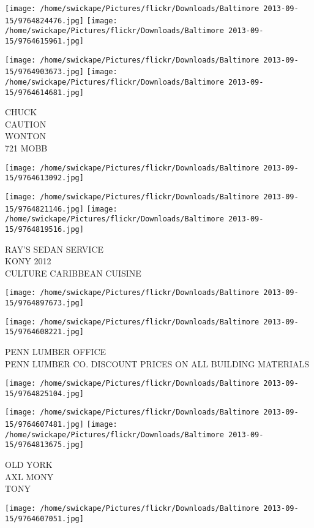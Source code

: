 \documentclass[10pt,letterpaper]{article}
\begin{document}
\texttt{[image: /home/swickape/Pictures/flickr/Downloads/Baltimore 2013-09-15/9764824476.jpg]}
\texttt{[image: /home/swickape/Pictures/flickr/Downloads/Baltimore 2013-09-15/9764615961.jpg]}

\texttt{[image: /home/swickape/Pictures/flickr/Downloads/Baltimore 2013-09-15/9764903673.jpg]}
\texttt{[image: /home/swickape/Pictures/flickr/Downloads/Baltimore 2013-09-15/9764614681.jpg]}

CHUCK\\
CAUTION\\
WONTON\\
721 MOBB
\pagebreak

\texttt{[image: /home/swickape/Pictures/flickr/Downloads/Baltimore 2013-09-15/9764613092.jpg]}

\vspace{0.25in}
\texttt{[image: /home/swickape/Pictures/flickr/Downloads/Baltimore 2013-09-15/9764821146.jpg]}
\texttt{[image: /home/swickape/Pictures/flickr/Downloads/Baltimore 2013-09-15/9764819516.jpg]}

RAY'S SEDAN SERVICE\\
KONY 2012\\
CULTURE CARIBBEAN CUISINE
\pagebreak

\texttt{[image: /home/swickape/Pictures/flickr/Downloads/Baltimore 2013-09-15/9764897673.jpg]}

\vspace{0.25in}
\texttt{[image: /home/swickape/Pictures/flickr/Downloads/Baltimore 2013-09-15/9764608221.jpg]}

PENN LUMBER OFFICE\\
PENN LUMBER CO. DISCOUNT PRICES ON ALL BUILDING MATERIALS
\pagebreak

\texttt{[image: /home/swickape/Pictures/flickr/Downloads/Baltimore 2013-09-15/9764825104.jpg]}

\vspace{0.25in}
\texttt{[image: /home/swickape/Pictures/flickr/Downloads/Baltimore 2013-09-15/9764607481.jpg]}
\texttt{[image: /home/swickape/Pictures/flickr/Downloads/Baltimore 2013-09-15/9764813675.jpg]}

OLD YORK\\
AXL MONY\\
TONY
\pagebreak

\texttt{[image: /home/swickape/Pictures/flickr/Downloads/Baltimore 2013-09-15/9764607051.jpg]}
\end{document}
